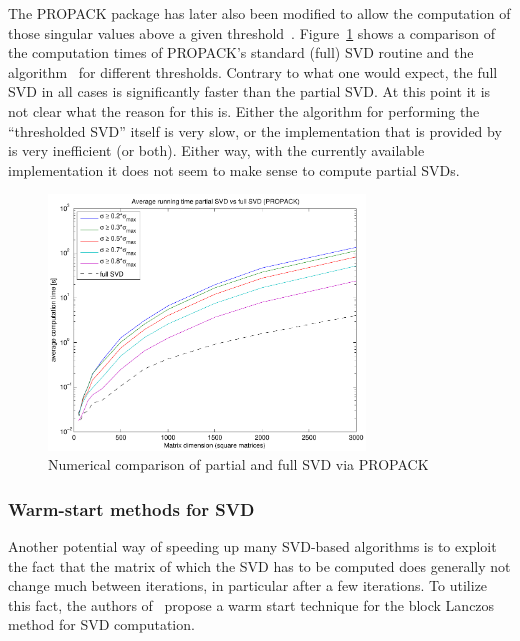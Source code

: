 \documentclass{../../common/projectreport}
\begin{document}
The PROPACK package has later also been modified to allow the computation of those singular values above a given threshold~\cite{Lin:2011kx}. Figure~\ref{Algorithms:Discussion:SVD:lasvdThrVSlasvd:figure} shows a comparison of the computation times of PROPACK's standard (full) SVD routine and the algorithm~\cite{Lin:2011kx} for different thresholds. Contrary to what one would expect, the full SVD in all cases is significantly faster than the partial SVD. At this point it is not clear what the reason for this is. Either the algorithm for performing the ``thresholded SVD'' itself is very slow, or the implementation that is provided by~\cite{Lin:2011kx} is very inefficient (or both). Either way, with the currently available implementation it does not seem to make sense to compute partial SVDs. 
%
\begin{figure}[htbp]
\centering
\includegraphics[width=0.75\textwidth]{../figures/thresh_svd_comparison}
\caption{Numerical comparison of partial and full SVD via PROPACK}
\label{Algorithms:Discussion:SVD:lasvdThrVSlasvd:figure}
\end{figure}





%
%


\subsubsection{Warm-start methods for SVD}
\label{Algorithms:Discussion:SVD:WarmstartSVD:Subsubsec}


Another potential way of speeding up many SVD-based algorithms is to exploit the fact that the matrix of which the SVD has to be computed does generally not change much between iterations, in particular after a few iterations. To utilize this fact, the authors
of~\cite{Lin:2010uq} propose a warm start technique for the block Lanczos method for SVD computation. 
\end{document}
